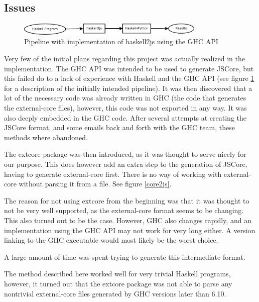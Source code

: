 \subsection{Issues}

\begin{figure}[H]
\centering
\includegraphics[width=0.8\textwidth]{diags/pipe_w_haskell2js}
\caption{Pipeline with implementation of haskell2js using the GHC API}
\label{haskell2js}
\end{figure}

Very few of the initial plans regarding this project was actually realized in the implementation.
The GHC API was intended to be used to generate JSCore, but this failed do to a lack of experience
with Haskell and the GHC API (see figure \ref{haskell2js} for a description of the initially intended
pipeline). It was then discovered that a lot of the necessary code was already
written in GHC (the code that generates the external-core files), however, this code was not 
exported in any way. It was also deeply embedded in the GHC code. After several attempts at creating
the JSCore format, and some emails back and forth with the GHC team, these methods where abandoned.

The extcore package was then introduced, as it was thought to serve nicely for our purpose. This
does however add an extra step to the generation of JSCore, having to generate external-core
first. There is no way of working with external-core without parsing it from a file. See figure \ref{core2js}.

The reason for not using extcore from the beginning was that it was thought to not be very 
well supported, as the external-core format seems to be changing. This also turned out to be
the case. However, GHC also changes rapidly, and an implementation using the GHC API may not
work for very long either. A version linking to the GHC executable would most likely be the
worst choice.

A large amount of time was spent trying to generate this intermediate format.

The method described here worked well for very trivial Haskell programs, however, it turned out that
the extcore package was not able to parse any nontrivial external-core files generated by GHC versions later 
than 6.10.

